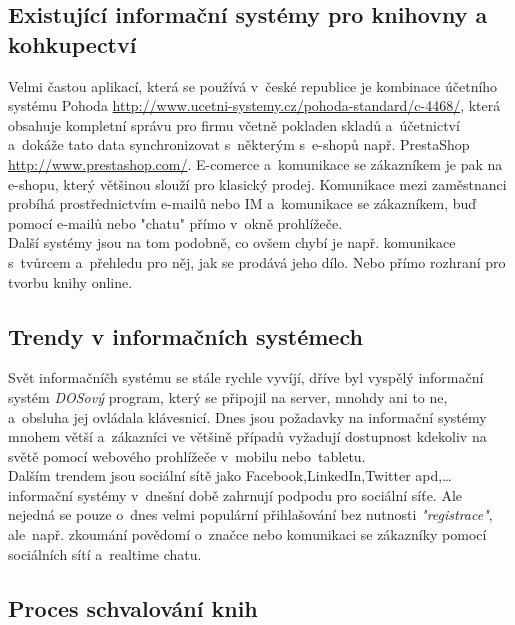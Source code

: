 \documentclass[a4paper,12pt,twoside,BCOR=10mm]{article}
\renewcommand{\it}[1]{\textit{#1}}    %
\begin{document}
\subsection{Existující informační systémy pro knihovny a kohkupectví}
Velmi častou aplikací, která se používá v~české republice je kombinace účetního systému Pohoda \href{http://www.ucetni-systemy.cz/pohoda-standard/c-4468/}{http://www.ucetni-systemy.cz/pohoda-standard/c-4468/}, která obsahuje kompletní správu pro firmu včetně pokladen skladů a~účetnictví a~dokáže tato data synchronizovat s~některým s~e-shopů např. PrestaShop \href{http://www.prestashop.com/}{http://www.prestashop.com/}. E-comerce a~komunikace se zákazníkem je pak na e-shopu, který většinou slouží pro klasický prodej. Komunikace mezi zaměstnanci probíhá prostřednictvím e-mailů nebo IM a~komunikace se zákazníkem, buď pomocí e-mailů nebo "chatu" přímo v~okně prohlížeče.\\

Další systémy jsou na tom podobně, co ovšem chybí je např. komunikace s~tvůrcem a~přehledu pro něj, jak se prodává jeho dílo. Nebo přímo rozhraní pro tvorbu knihy online.\\

\subsection{Trendy v informačních systémech}
Svět informačníčh systému se stále rychle vyvíjí, dříve byl vyspělý informační systém \it{DOSový} program, který se připojil na server, mnohdy ani to ne, a~obsluha jej ovládala klávesnicí. Dnes jsou požadavky na informační systémy mnohem větší a~zákazníci ve většině případů vyžadují dostupnost kdekoliv na světě pomocí webového prohlížeče v~mobilu nebo~tabletu.\cite{trendsIS}\\

Dalším trendem jsou sociální sítě jako Facebook,LinkedIn,Twitter apd,… informační systémy v~dnešní době zahrnují podpodu pro sociální síťe. Ale nejedná se pouze o~dnes velmi populární přihlašování bez nutnosti \it{"registrace"}, ale~např. zkoumání povědomí o~značce nebo komunikaci se zákazníky pomocí sociálních sítí a~realtime chatu.\cite{trendsIS}\\

\subsection{Proces schvalování knih}\label{sec:schvalovani}
\end{document}
